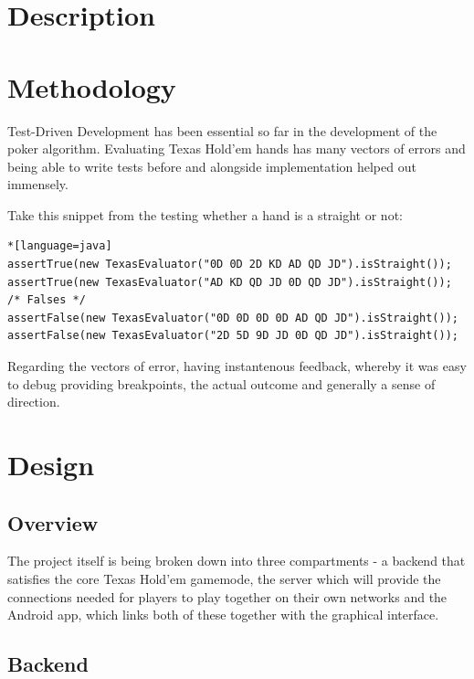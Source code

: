 \documentclass[11pt]{article}
\begin{document}
\section{Description}



\section{Methodology}

Test-Driven Development has been essential so far in the development of the poker algorithm. Evaluating Texas Hold'em hands has many vectors of errors and being able to write tests before and alongside implementation helped out immensely. 

Take this snippet from the testing whether a hand is a straight or not: 

\begin{lstlisting}*[language=java]
assertTrue(new TexasEvaluator("0D 0D 2D KD AD QD JD").isStraight());
assertTrue(new TexasEvaluator("AD KD QD JD 0D QD JD").isStraight());
/* Falses */
assertFalse(new TexasEvaluator("0D 0D 0D 0D AD QD JD").isStraight());
assertFalse(new TexasEvaluator("2D 5D 9D JD 0D QD JD").isStraight());

\end{lstlisting}

Regarding the vectors of error, having instantenous feedback, whereby it was easy to debug providing breakpoints, the actual outcome and generally a sense of direction. 



\section{Design}

\subsection{Overview}

The project itself is being broken down into three compartments - a backend that satisfies the core Texas Hold'em gamemode, the server which will provide the connections needed for players to play together on their own networks and the Android app, which links both of these together with the graphical interface. 

\subsection{Backend}
\end{document}
